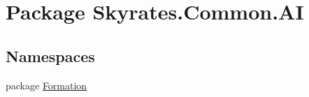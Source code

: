 \hypertarget{namespace_skyrates_1_1_common_1_1_a_i}{\section{Package Skyrates.\-Common.\-A\-I}
\label{namespace_skyrates_1_1_common_1_1_a_i}
}
\subsection*{Namespaces}
\begin{DoxyCompactItemize}
\item 
package \hyperlink{namespace_skyrates_1_1_common_1_1_a_i_1_1_formation}{Formation}
\end{DoxyCompactItemize}

